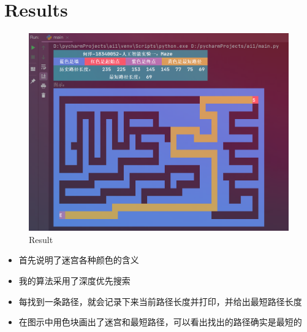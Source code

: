 \documentclass[a4paper, 11pt]{article}
\begin{document}
\section{Results}
\begin{figure}[!h]
\centering
\includegraphics[width=13cm]{result.png}

\caption{Result}
\end{figure}
\begin{itemize}
	\item 首先说明了迷宫各种颜色的含义
	\item 我的算法采用了深度优先搜索
	\item 每找到一条路径，就会记录下来当前路径长度并打印，并给出最短路径长度
	\item 在图示中用色块画出了迷宫和最短路径，可以看出找出的路径确实是最短的
\end{itemize}

%
%
\end{document}
